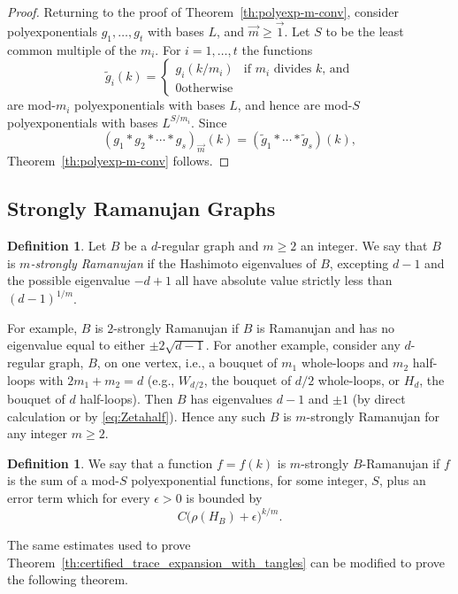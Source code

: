 \documentclass{memo-l}
\theoremstyle{plain}
\theoremstyle{definition}
\newtheorem{definition}[theorem]{Definition}
\numberwithin{section}{chapter}
\numberwithin{equation}{chapter}
\theoremstyle{plain}
\theoremstyle{definition}
\begin{document}
\begin{proof}
Returning to the proof of Theorem~\ref{th:polyexp-m-conv}, consider
polyexponentials $g_1,\ldots,g_t$ with bases $L$,
and $\vec m\ge \vec 1$.
Let $S$ to be the least common multiple of the $m_i$.
For $i=1,\ldots,t$ the functions
$$
\tilde g_i(k) = \left\{ \begin{array}{ll} g_i(k/m_i) & 
\mbox{if $m_i$ divides $k$, and} \\ 0 \mbox{otherwise} \end{array}\right.
$$ 
are mod-$m_i$ polyexponentials with
bases $L$, and hence are mod-$S$ polyexponentials with bases
$L^{S/m_i}$.  Since
$$
(g_1 \ast g_2 \ast \cdots \ast g_s)_{\vec m}(k)
=
(\tilde g_1 \ast \cdots \ast \tilde g_s)(k),
$$
Theorem~\ref{th:polyexp-m-conv} follows.
\end{proof}


\subsection{Strongly Ramanujan Graphs}

\begin{definition} 
Let $B$ be a $d$-regular graph and $m\ge 2$ an integer.  
We say that $B$ is {\em $m$-strongly
Ramanujan} if the Hashimoto eigenvalues of $B$, excepting $d-1$
and the possible eigenvalue $-d+1$ 
all have absolute value strictly less than $(d-1)^{1/m}$.
\end{definition}

For example, $B$ is $2$-strongly Ramanujan if $B$ is Ramanujan and
has no eigenvalue equal to either $\pm 2\sqrt{d-1}$.
For another example, consider any $d$-regular
graph, $B$, on one vertex, i.e., a bouquet of $m_1$ whole-loops and 
$m_2$ half-loops with $2m_1+m_2=d$
(e.g.,
$W_{d/2}$, the bouquet of $d/2$ whole-loops, or $H_d$, the bouquet of
$d$ half-loops).
Then $B$ has eigenvalues $d-1$ and $\pm 1$ (by direct calculation
or by \eqref{eq:Zetahalf}).
Hence any such $B$ is $m$-strongly Ramanujan for any integer $m\ge 2$.

\begin{definition}\label{de:strongly_Ramanujna}
We say that a function $f=f(k)$ is $m$-strongly $B$-Ramanujan if
$f$ is the sum of a mod-$S$ polyexponential functions, for some integer,
$S$, plus an error term which for every $\epsilon>0$ is bounded by
$$
C \bigl( \rho(H_B) + \epsilon \bigr)^{k/m}.
$$
\end{definition}

The same estimates used to prove 
Theorem~\ref{th:certified_trace_expansion_with_tangles} can be modified
to prove the following theorem.
\end{document}
